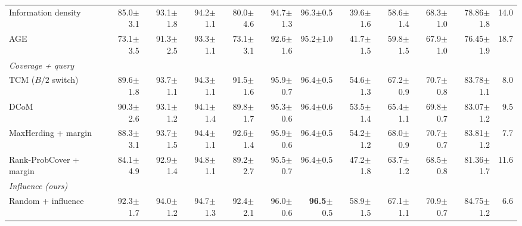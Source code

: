\begin{table}[t]
\begin{adjustbox}{max width=\textwidth}
\begin{tabular}{lrrrrrrrrrrr}
\quad Information density~\cite{settles2008analysis} & 85.0{\scriptsize$\pm$3.1} & 93.1{\scriptsize$\pm$1.8} & 94.2{\scriptsize$\pm$1.1} & 80.0{\scriptsize$\pm$4.6} & 94.7{\scriptsize$\pm$1.3} & 96.3{\scriptsize$\pm$0.5} & 39.6{\scriptsize$\pm$1.6} & 58.6{\scriptsize$\pm$1.4} & 68.3{\scriptsize$\pm$1.0} & 78.86{\scriptsize$\pm$1.8} & 14.0 \\
\quad AGE~\cite{cai2017active} & 73.1{\scriptsize$\pm$3.5} & 91.3{\scriptsize$\pm$2.5} & 93.3{\scriptsize$\pm$1.1} & 73.1{\scriptsize$\pm$3.1} & 92.6{\scriptsize$\pm$1.6} & 95.2{\scriptsize$\pm$1.0} & 41.7{\scriptsize$\pm$1.5} & 59.8{\scriptsize$\pm$1.5} & 67.9{\scriptsize$\pm$1.0} & 76.45{\scriptsize$\pm$1.9} & 18.7 \\
\multicolumn{12}{l}{\textit{Coverage + query}} \\
\quad TCM ($B/2$ switch)~\cite{doucet2024bridging} & 89.6{\scriptsize$\pm$1.8} & 93.7{\scriptsize$\pm$1.1} & 94.3{\scriptsize$\pm$1.1} & 91.5{\scriptsize$\pm$1.6} & 95.9{\scriptsize$\pm$0.7} & 96.4{\scriptsize$\pm$0.5} & 54.6{\scriptsize$\pm$1.3} & 67.2{\scriptsize$\pm$0.9} & 70.7{\scriptsize$\pm$0.8} & 83.78{\scriptsize$\pm$1.1} & 8.0 \\
\quad DCoM~\cite{mishal2024dcom} & 90.3{\scriptsize$\pm$2.6} & 93.1{\scriptsize$\pm$1.2} & 94.1{\scriptsize$\pm$1.4} & 89.8{\scriptsize$\pm$1.7} & 95.3{\scriptsize$\pm$0.6} & 96.4{\scriptsize$\pm$0.6} & 53.5{\scriptsize$\pm$1.4} & 65.4{\scriptsize$\pm$1.1} & 69.8{\scriptsize$\pm$0.7} & 83.07{\scriptsize$\pm$1.2} & 9.5 \\
\quad MaxHerding + margin & 88.3{\scriptsize$\pm$3.1} & 93.7{\scriptsize$\pm$1.5} & 94.4{\scriptsize$\pm$1.1} & 92.6{\scriptsize$\pm$1.4} & 95.9{\scriptsize$\pm$0.6} & 96.4{\scriptsize$\pm$0.5} & 54.2{\scriptsize$\pm$1.2} & 68.0{\scriptsize$\pm$0.9} & 70.7{\scriptsize$\pm$0.7} & 83.81{\scriptsize$\pm$1.2} & 7.7 \\
\quad Rank-ProbCover + margin & 84.1{\scriptsize$\pm$4.9} & 92.9{\scriptsize$\pm$1.4} & 94.8{\scriptsize$\pm$1.1} & 89.2{\scriptsize$\pm$2.7} & 95.5{\scriptsize$\pm$0.7} & 96.4{\scriptsize$\pm$0.5} & 47.2{\scriptsize$\pm$1.8} & 63.7{\scriptsize$\pm$1.2} & 68.5{\scriptsize$\pm$0.8} & 81.36{\scriptsize$\pm$1.7} & 11.6 \\
\multicolumn{12}{l}{\textit{Influence (ours)}} \\
\quad Random + influence & 92.3{\scriptsize$\pm$1.7} & 94.0{\scriptsize$\pm$1.2} & 94.7{\scriptsize$\pm$1.3} & 92.4{\scriptsize$\pm$2.1} & 96.0{\scriptsize$\pm$0.6} & \textbf{96.5}{\scriptsize$\pm$0.5} & 58.9{\scriptsize$\pm$1.5} & 67.1{\scriptsize$\pm$1.1} & 70.9{\scriptsize$\pm$0.7} & 84.75{\scriptsize$\pm$1.2} & 6.6 \\

\end{tabular}
\end{adjustbox}
\end{table}
